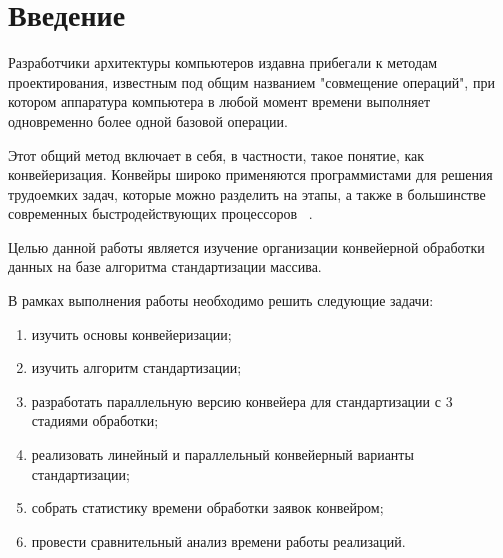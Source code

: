 \chapter*{Введение}

Разработчики архитектуры компьютеров издавна прибегали к методам проектирования, известным под общим названием "совмещение операций", при котором аппаратура компьютера в любой момент времени выполняет одновременно более одной базовой операции. 

Этот общий метод включает в себя, в частности, такое понятие, как конвейеризация. Конвейры широко применяются программистами для решения трудоемких задач, которые можно разделить на этапы, а также в большинстве современных быстродействующих процессоров ~\cite{first_article}. 


Целью данной работы является изучение организации конвейерной обработки данных на базе алгоритма стандартизации массива.


В рамках выполнения работы необходимо решить следующие задачи: 
\begin{enumerate}[label={\arabic*)}]
	\item изучить основы конвейеризации;
	\item изучить алгоритм стандартизации;
	\item разработать параллельную версию конвейера для стандартизации с 3 стадиями обработки;
	\item реализовать линейный и параллельный конвейерный варианты стандартизации;
	\item собрать статистику времени обработки заявок конвейром;
	\item провести сравнительный анализ времени работы реализаций.
\end{enumerate}
